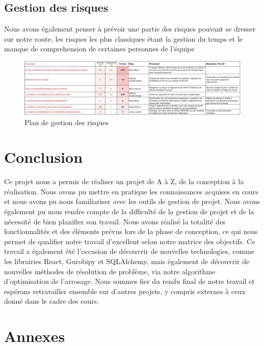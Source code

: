 \documentclass[french,a4paper]{article}
\begin{document}
\subsection{Gestion des risques}
Nous avons également penser à prévoir une partie des risques pouvant se dresser sur notre route, les risques les plus classiques étant
la gestion du temps et le manque de comprehension de certaines personnes de l'équipe
\begin{figure}[H]
    \centering
    \includegraphics[width=1\textwidth]{img/Plan_gestion_risque.png}
    \caption{Plan de gestion des risques}
\end{figure}

\section{Conclusion}
Ce projet nous a permis de réaliser un projet de A à Z, de la conception à la réalisation. Nous avons pu mettre en pratique les connaissances acquises en cours et nous avons pu nous familiariser avec les outils de gestion de projet. Nous avons également pu nous rendre compte de la difficulté de la gestion de projet et de la nécessité de bien planifier son travail.
Nous avons réalisé la totalité des fonctionnalités et des éléments prévus lors de la phase de conception, ce qui nous permet de qualifier notre travail d'excellent selon notre matrice des objectifs.
Ce travail a également été l'occasion de découvrir de nouvelles technologies, comme les librairies React, Gurobipy et SQLAlchemy, mais également de découvrir de nouvelles méthodes de résolution de problème, via notre algorithme d'optimisation de l'arrosage.
Nous sommes fier du rendu final de notre travail et espérons retravailler ensemble sur d'autres projets, y compris externes à ceux donné dans le cadre des cours.
\section{Annexes}






\end{document}
